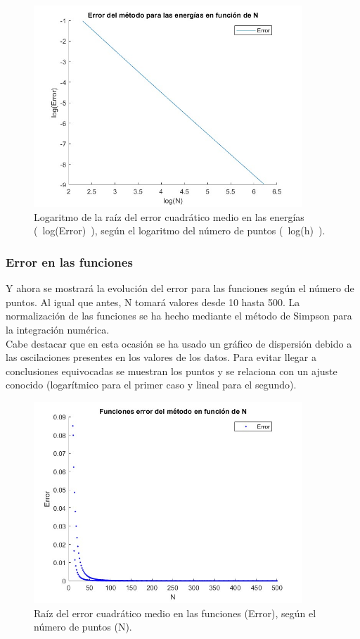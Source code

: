 \documentclass[12pt]{article}
\begin{document}
    \begin{figure}[H]
        \centering
        \includegraphics[width=0.9\textwidth]{fotos/logerror_ener_infinito_500.jpg}
        \caption{Logaritmo de la raíz del error cuadrático medio en las energías (~log(Error)~), según el logaritmo del número de puntos (~log(h)~).}
        \end{figure}

\subsubsection{Error en las funciones}
Y ahora se mostrará la evolución del error 
para las funciones según el número de puntos. 
Al igual que antes, N tomará valores desde 10 hasta 500.
La normalización de las funciones se ha hecho mediante 
el método de Simpson para la integración numérica.\\

    Cabe destacar que en esta ocasión se ha usado un gráfico de dispersión debido a las oscilaciones presentes en los valores de los datos. Para evitar llegar a conclusiones equivocadas se muestran los puntos y se relaciona con un ajuste conocido (logarítmico para el primer caso y lineal para el segundo).
    
   \begin{figure}[H]
        \centering
        \includegraphics[width=0.9\textwidth]{fotos/errorr_funci_infinito_500.jpg}
        \caption{Raíz del error cuadrático medio en las funciones (Error), según el número de puntos (N).}
        \end{figure} 
\end{document}
